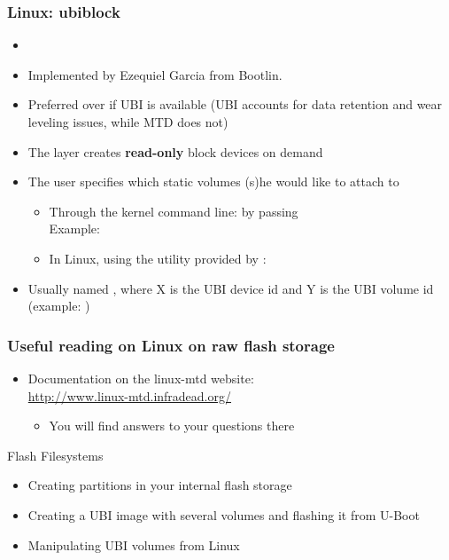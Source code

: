 \begin{frame}
  \frametitle{Linux: ubiblock}
  \begin{itemize}
  \item {}
  \item Implemented by Ezequiel Garcia from Bootlin.
  \item Preferred over  if UBI is available (UBI accounts
    for data retention and wear leveling issues, while MTD does not)
  \item The  layer creates {\bf read-only} block devices
    on demand
  \item The user specifies which static volumes (s)he would like to attach
    to 
    \begin{itemize}
    \item Through the kernel command line: by passing
      \\
      Example: \\
    \item In Linux, using the  utility provided by :
    \end{itemize}
   \item Usually named , where X is the UBI device
     id and Y is the UBI volume id (example: )
  \end{itemize}
\end{frame}

\begin{frame}
  \frametitle{Useful reading on Linux on raw flash storage}
  \begin{itemize}
  \item Documentation on the linux-mtd website:\\
    \url{http://www.linux-mtd.infradead.org/}
    \begin{itemize}
	\item You will find answers to your questions there
    \end{itemize}
  \end{itemize}
\end{frame}

\setuplabframe
{Flash Filesystems}
{
  \begin{itemize}
  \item Creating partitions in your internal flash storage
  \item Creating a UBI image with several volumes and flashing it from
    U-Boot
  \item Manipulating UBI volumes from Linux
  \end{itemize}
}
